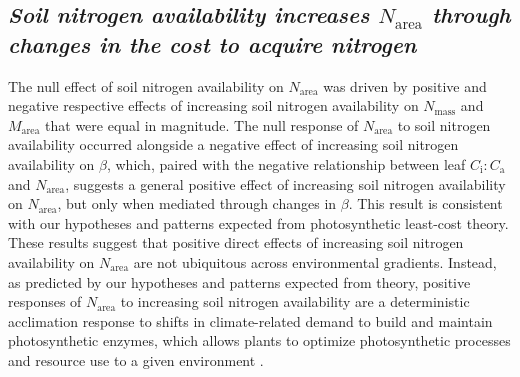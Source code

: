 \begin{singlespace}
\subsection{\textit{Soil nitrogen availability increases $N_\mathrm{area}$ through changes in the cost to acquire nitrogen}}
\end{singlespace}
The null effect of soil nitrogen availability on $N_\mathrm{area}$ was driven by positive and negative respective effects of increasing soil nitrogen availability on $N_\mathrm{mass}$ and $M_\mathrm{area}$ that were equal in magnitude. The null response of $N_\mathrm{area}$ to soil nitrogen availability occurred alongside a negative effect of increasing soil nitrogen availability on $\beta$, which, paired with the negative relationship between leaf $C_\mathrm{i}\mathrm{:}C_\mathrm{a}$ and $N_\mathrm{area}$, suggests a general positive effect of increasing soil nitrogen availability on $N_\mathrm{area}$, but only when mediated through changes in $\beta$. This result is consistent with our hypotheses and patterns expected from photosynthetic least-cost theory. These results suggest that positive direct effects of increasing soil nitrogen availability on $N_\mathrm{area}$ are not ubiquitous across environmental gradients. Instead, as predicted by our hypotheses and patterns expected from theory, positive responses of $N_\mathrm{area}$ to increasing soil nitrogen availability are a deterministic acclimation response to shifts in climate-related demand to build and maintain photosynthetic enzymes, which allows plants to optimize photosynthetic processes and resource use to a given environment .

